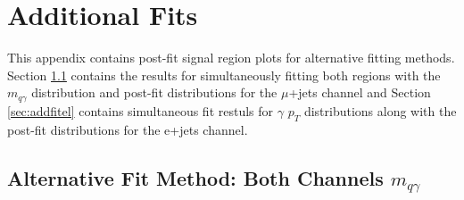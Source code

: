 \chapter{Additional Fits}
\label{app:AddFits}
%
%
This appendix contains post-fit signal region plots for alternative fitting methods.  Section \ref{sec:addfitmu} contains the results for simultaneously fitting both regions with the $m_{q\gamma}$ distribution and post-fit distributions for the $\mu$+jets channel and Section \ref{sec:addfitel} contains simultaneous fit restuls for $\gamma$  $p_T$ distributions along with the post-fit distributions for the e+jets channel.

\section{Alternative Fit Method: Both Channels $m_{q\gamma}$}
\label{sec:addfitmu}

